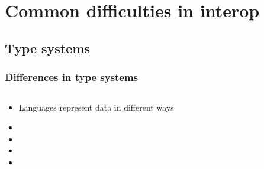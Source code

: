 \documentclass{beamer}
\begin{document}
\section[Difficulties]{Common difficulties in interop}


\subsection{Type systems}
\begin{frame}
  \frametitle{Differences in type systems}
  
  \begin{columns}
  \begin{column}{0.6\textwidth}
  \begin{itemize}
  	\item Languages represent data in different ways %
	\item 
	\item 
	\item 
	\item 
  \end{itemize}
  \end{column}
  
  \begin{column}{0.5\textwidth}
  
  \end{column}
  \end{columns}
\end{frame}
\end{document}
